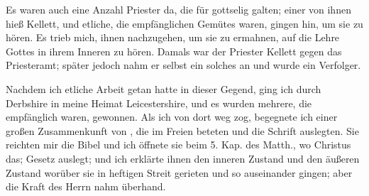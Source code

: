 Es waren auch eine Anzahl Priester da, die für gottselig
galten; einer von ihnen hieß Kellett, und etliche, die empfänglichen
Gemütes waren, gingen hin, um sie zu hören. Es trieb mich,
ihnen nachzugehen, um sie zu ermahnen, auf die Lehre Gottes in
ihrem Inneren zu hören. Damals war der Priester Kellett gegen
das Priesteramt; später jedoch nahm er selbst ein solches an und
wurde ein Verfolger.

Nachdem ich etliche Arbeit getan hatte in dieser Gegend,
ging ich durch Derbshire in meine 
Heimat Leicestershire, und
es wurden mehrere, die empfänglich waren, gewonnen. Als ich
von dort weg zog, begegnete ich einer großen Zusammenkunft
von , die im Freien beteten und die Schrift 
auslegten. Sie reichten mir die Bibel und ich öffnete sie beim 5. Kap.
des Matth., wo Christus das; 
Gesetz auslegt; und ich erklärte
ihnen den inneren Zustand und den äußeren Zustand worüber sie
in heftigen Streit gerieten und so auseinander gingen; aber die
Kraft des Herrn nahm überhand.

